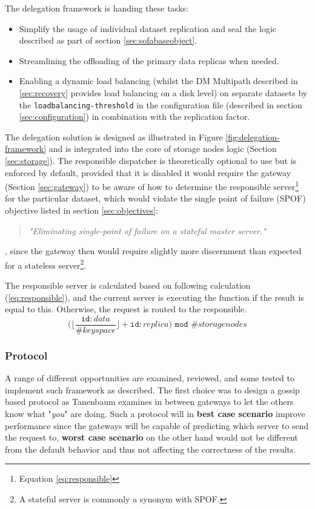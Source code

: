 \noindent
The delegation framework is handing these tasks:
\begin{itemize}
	\item Simplify the usage of individual dataset replication and seal the logic described as part of section \ref{sec:sofabaseobject}.
	\item Streamlining the offloading of the primary data replicas when needed.
	\item Enabling a dynamic load balancing (whilst the DM Multipath described in \ref{sec:recovery} provides load balancing on a disk level) on separate datasets by the \texttt{load\-balancing-threshold} in the configuration file (described in section \ref{sec:configuration}) in combination with the replication factor.
\end{itemize}
\vspace*{4mm}
The delegation solution is designed as illustrated in Figure \ref{fig:delegation-framework} and is integrated into the core of storage nodes logic (Section \ref{sec:storage}). The responsible dispatcher is theoretically optional to use but is enforced by default, provided that it is disabled it would require the gateway (Section \ref{sec:gateway}) to be aware of how to determine the responsible server\footnote{Equation \ref{eq:responsible}} for the particular dataset, which would violate the single point of failure (SPOF) objective listed in section \ref{sec:objectives}:
\begin{quotation}
\textit{"Eliminating single-point of failure on a stateful master server."}
\end{quotation}
, since the gateway then would require slightly more discernment than expected for a stateless server\footnote{\label{note:stateful}A stateful server is commonly a synonym with SPOF.}.
\clearpage

The responsible server is calculated based on following calculation (\ref{eq:responsible}), and the current server is executing the function if the result is equal to this. Otherwise, the request is routed to the responsible.
\begin{equation} \label{eq:responsible}
\Big(\Big\lfloor\dfrac{\texttt{id}:data}{\texttt{\#}keyspace}\Big\rfloor + \texttt{id}:replica\Big) \texttt{ mod } \texttt{\#}storagenodes
\end{equation}

\subsubsection*{Protocol}
A range of different opportunities are examined, reviewed, and some tested to implement such framework as described. The first choice was to design a gossip based protocol as Tanenbaum \etal examines in \cite{Tanenbaum:2006:DSP:1202502} between gateways to let the others know what "\textit{you}" are doing. Such a protocol will in \textbf{best case scenario} improve performance since the gateways will be capable of predicting which server to send the request to, \textbf{worst case scenario} on the other hand would not be different from the default behavior and thus not affecting the correctness of the results.
\newline

